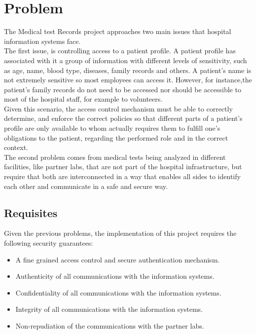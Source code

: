 \section{Problem}

The Medical test Records project approaches two main issues that hospital information systems face. \\

The first issue, is controlling access to a patient profile.
A patient profile has associated with it a group of information with different levels of sensitivity, such as age, name, blood type, diseases, family records and others.
A patient's name is not extremely sensitive so most employees can access it. However, for instance,the patient's family records do not need to be accessed nor should be accessible to most of the hospital staff, for example to volunteers. \\

Given this scenario, the access control mechanism must be able to correctly determine, and enforce the correct policies so that different parts of a patient's profile are only available to whom actually requires them to fulfill one's obligations to the patient, regarding the performed role and in the correct context. \\

The second problem comes from medical tests being analyzed in different facilities, like partner labs, that are not part of the hospital infrastructure, but require that both are interconnected in a way that enables all sides to identify each other and communicate in a safe and secure way. \\

\subsection{Requisites}

Given the previous problems, the implementation of this project requires the following security guarantees:
\begin{itemize}
	\item A fine grained access control and secure authentication mechanism.
	\item Authenticity of all communications with the information systems.
	\item Confidentiality of all communications with the information systems.
	\item Integrity of all communications with the information systems.
	\item Non-repudiation of the communications with the partner labs.
\end{itemize}

